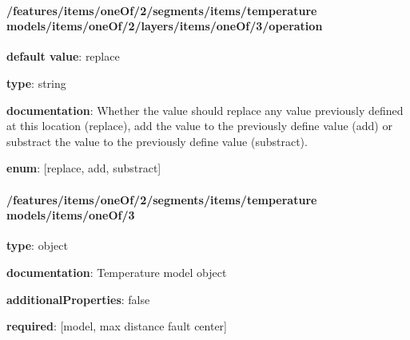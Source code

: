 \begin{itemized}
\end{itemized}\paragraph{/features/items/oneOf/2/segments/items/temperature models/items/oneOf/2/layers/items/oneOf/3/operation} \begin{itemized}
\item {\bf default value}: replace
\item {\bf type}: string
\item {\bf documentation}: Whether the value should replace any value previously defined at this location (replace), add the value to the previously define value (add) or substract the value to the previously define value (substract).
\item {\bf enum}: [replace, add, substract]\end{itemized}\paragraph{/features/items/oneOf/2/segments/items/temperature models/items/oneOf/3} \begin{itemized}
\item {\bf type}: object
\item {\bf documentation}: Temperature model object
\item {\bf additionalProperties}: false
\item {\bf required}: [model, max distance fault center]\end{itemized}

